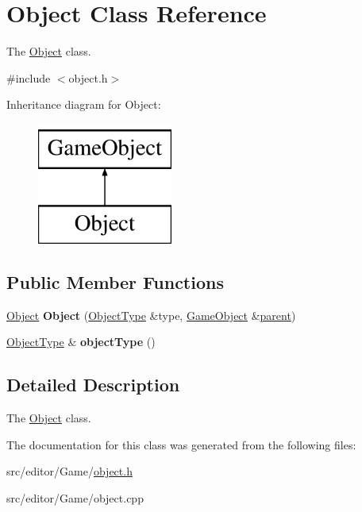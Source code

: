 \hypertarget{class_object}{\section{\-Object \-Class \-Reference}
\label{class_object}
}


\-The \hyperlink{class_object}{\-Object} class.  




{\ttfamily \#include $<$object.\-h$>$}

\-Inheritance diagram for \-Object\-:\begin{figure}[H]
\begin{center}
\leavevmode
\includegraphics[height=4.000000cm]{class_object}
\end{center}
\end{figure}
\subsection*{\-Public \-Member \-Functions}
\begin{DoxyCompactItemize}
\item 
\hypertarget{class_object_ac0b6088495eae65bc1fd37c13423806a}{\hyperlink{class_object}{\-Object} {\bfseries \-Object} (\hyperlink{class_object_type}{\-Object\-Type} \&type, \hyperlink{class_game_object}{\-Game\-Object} \&\hyperlink{class_game_object_af3deaf39cde23c189765634e32e95bb4}{parent})}\label{class_object_ac0b6088495eae65bc1fd37c13423806a}

\item 
\hypertarget{class_object_ab0ea9f3d551da32c158b7cf791b622d0}{\hyperlink{class_object_type}{\-Object\-Type} \& {\bfseries object\-Type} ()}\label{class_object_ab0ea9f3d551da32c158b7cf791b622d0}

\end{DoxyCompactItemize}


\subsection{\-Detailed \-Description}
\-The \hyperlink{class_object}{\-Object} class. 

\-The documentation for this class was generated from the following files\-:\begin{DoxyCompactItemize}
\item 
src/editor/\-Game/\hyperlink{object_8h}{object.\-h}\item 
src/editor/\-Game/object.\-cpp\end{DoxyCompactItemize}
